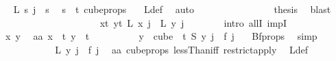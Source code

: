 \begin{isabellebody}
\ \isamarkupfalse%
\ {\isachardoublequoteopen}L\ s\ j\ {\isacharequal}{\kern0pt}\ s{\isachardoublequoteclose}\ \isamarkupfalse%
\ {\isacartoucheopen}s\ {\isacharless}{\kern0pt}\ t{\isacartoucheclose}\ cube{\isacharunderscore}{\kern0pt}props{\isacharparenleft}{\kern0pt}{}{\isacharcomma}{\kern0pt}{}{\isacharparenright}{\kern0pt}\ \ \isamarkupfalse%
\ L{\isacharunderscore}{\kern0pt}def\ \isamarkupfalse%
\ auto\isanewline
\ \ \ \ \ \ \isamarkupfalse%
\isanewline
\ \ \ \ \ \ \isamarkupfalse%
\ \isamarkupfalse%
\ {\isacharquery}{\kern0pt}thesis\ \isamarkupfalse%
\ blast\isanewline
\ \ \ \ \isamarkupfalse%
\isanewline
\ \ \ \ \ \ \isamarkupfalse%
\ {}\isanewline
\ \ \ \ \ \ \isamarkupfalse%
\ {\isachardoublequoteopen}{\isacharparenleft}{\kern0pt}{\isasymforall}x{\isacharless}{\kern0pt}t{\isachardot}{\kern0pt}\ {\isasymforall}y{\isacharless}{\kern0pt}t{\isachardot}{\kern0pt}\ L\ x\ j\ {\isacharequal}{\kern0pt}\ L\ y\ j{\isacharparenright}{\kern0pt}{\isachardoublequoteclose}\isanewline
\ \ \ \ \ \ \isamarkupfalse%
\ {\isacharparenleft}{\kern0pt}intro\ allI\ impI{\isacharparenright}{\kern0pt}\isanewline
\ \ \ \ \ \ \ \ \isamarkupfalse%
\ x\ y\ \isamarkupfalse%
\ aa{\isacharcolon}{\kern0pt}\ {\isachardoublequoteopen}x\ {\isacharless}{\kern0pt}\ t{\isachardoublequoteclose}\ {\isachardoublequoteopen}y\ {\isacharless}{\kern0pt}\ t{\isachardoublequoteclose}\isanewline
\ \ \ \ \ \ \ \ \isamarkupfalse%
\ {\isachardoublequoteopen}{\isasymforall}y\ {\isasymin}\ cube\ {}\ t{\isachardot}{\kern0pt}\ S\ y\ j\ {\isacharequal}{\kern0pt}\ f\ j{\isachardoublequoteclose}\ \isamarkupfalse%
\ {}\ Bf{\isacharunderscore}{\kern0pt}props\ \isamarkupfalse%
\ simp\isanewline
\ \ \ \ \ \ \ \ \isamarkupfalse%
\ \isamarkupfalse%
\ {\isachardoublequoteopen}L\ y\ j\ {\isacharequal}{\kern0pt}\ f\ j{\isachardoublequoteclose}\ \isamarkupfalse%
\ aa{\isacharparenleft}{\kern0pt}{}{\isacharparenright}{\kern0pt}\ cube{\isacharunderscore}{\kern0pt}props{\isacharparenleft}{\kern0pt}{}{\isacharcomma}{\kern0pt}{}{\isacharparenright}{\kern0pt}\ lessThan{\isacharunderscore}{\kern0pt}iff\ restrict{\isacharunderscore}{\kern0pt}apply\ \isamarkupfalse%
\ L{\isacharunderscore}{\kern0pt}def\ \isamarkupfalse%

\end{isabellebody}
